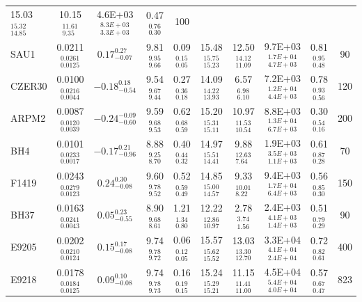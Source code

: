 \documentclass[draft]{aa}
\begin{document}
\begin{table}
\begin{tabular}{lccccccccc}
  15.03$_{14.85}^{15.32}$ & 10.15$_{9.35}^{11.61}$ & 4.6E+03$_{3.3E+03}^{8.3E+03}$ & 0.47$_{0.30}^{0.76}$ &
  100 \\[.2cm]
  SAU1  & 0.0211$_{0.0125}^{0.0261}$ & $0.17_{-0.07}^{0.27}$ & 9.81 $_{9.66}^{9.95 }$ & 0.09$_{0.05}^{0.15}$ &
  15.48$_{15.23}^{15.75}$ & 12.50$_{11.09}^{14.12}$ & 9.7E+03$_{4.7E+03}^{1.7E+04}$ & 0.81$_{0.48}^{0.95}$ &
  90 \\[.2cm]
  CZER30 & 0.0100$_{0.0044}^{0.0216}$ & $-0.18_{-0.54}^{0.18}$ & 9.54 $_{9.44}^{9.67 }$ & 0.27$_{0.18}^{0.36}$ &
  14.09$_{13.93}^{14.22}$ & 6.57$_{6.10}^{6.98}$ & 7.2E+03$_{4.4E+03}^{1.2E+04}$ & 0.78$_{0.56}^{0.93}$ &
  120 \\[.2cm]
  ARPM2 & 0.0087$_{0.0039}^{0.0120}$ & $-0.24_{-0.60}^{-0.09}$ & 9.59 $_{9.53}^{9.68 }$ & 0.62$_{0.59}^{0.68}$ &
  15.20$_{15.11}^{15.31}$ & 10.97$_{10.54}^{11.53}$ & 8.8E+03$_{6.7E+03}^{1.3E+04}$ & 0.30$_{0.16}^{0.54}$ &
  200 \\[.2cm]
  BH4 & 0.0101$_{0.0017}^{0.0233}$ & $-0.17_{-0.96}^{0.21}$ & 8.88$_{8.70}^{9.25}$ & 0.40$_{0.32}^{0.44}$ &
  14.97$_{14.41}^{15.51}$ & 9.88$_{7.64}^{12.63}$ & 1.9E+03$_{1.1E+03}^{3.5E+03}$ & 0.61$_{0.28}^{0.87}$ &
  70 \\[.2cm]
  F1419 & 0.0243$_{0.0123}^{0.0279}$ & $0.24_{-0.08}^{0.30}$ & 9.60 $_{9.52}^{9.78 }$ & 0.52$_{0.49}^{0.59}$ &
  14.85$_{14.57}^{15.00}$ & 9.33$_{8.22}^{10.01}$ & 9.4E+03$_{6.4E+03}^{1.7E+04}$ & 0.56$_{0.30}^{0.85}$ &
  150 \\[.2cm]
  BH37 & 0.0163$_{0.0043}^{0.0241}$ & $0.05_{-0.55}^{0.23}$ & 8.90 $_{8.61}^{9.68 }$ & 1.21$_{0.80}^{1.34}$ &
  12.22$_{10.97}^{12.86}$ & 2.78$_{1.56}^{3.74}$ & 2.4E+03$_{1.4E+03}^{4.1E+03}$ & 0.51$_{0.29}^{0.79}$ &
  90 \\[.2cm]
  E9205 & 0.0202$_{0.0124}^{0.0210}$ & $0.15_{-0.08}^{0.17}$ & 9.74 $_{9.72}^{9.78 }$ & 0.06$_{0.05}^{0.12}$ &
  15.57$_{15.52}^{15.62}$ & 13.03$_{12.70}^{13.30}$ & 3.3E+04$_{2.4E+04}^{4.1E+04}$ & 0.72$_{0.61}^{0.82}$ &
  400 \\[.2cm]
  E9218 & 0.0178$_{0.0125}^{0.0184}$ & $0.09_{-0.08}^{0.10}$ & 9.74 $_{9.73}^{9.78 }$ & 0.16$_{0.15}^{0.19}$ &
  15.24$_{15.21}^{15.29}$ & 11.15$_{11.00}^{11.41}$ & 4.5E+04$_{4.0E+04}^{5.4E+04}$ & 0.57$_{0.47}^{0.67}$ &
  823 \\[.2cm]

\end{tabular}
\end{table}
\end{document}
